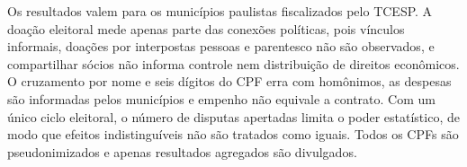 \documentclass[11pt,a4paper]{article}
\begin{document}
Os resultados valem para os municípios paulistas fiscalizados pelo TCESP. A doação eleitoral
mede apenas parte das conexões políticas, pois vínculos informais, doações por interpostas
pessoas e parentesco não são observados, e compartilhar sócios não informa controle nem
distribuição de direitos econômicos. O cruzamento por nome e seis dígitos do CPF erra com
homônimos, as despesas são informadas pelos municípios e empenho não equivale a contrato. Com um
único ciclo eleitoral, o número de disputas apertadas limita o poder estatístico, de modo que
efeitos indistinguíveis não são tratados como iguais. Todos os CPFs são pseudonimizados e
apenas resultados agregados são divulgados.

\newpage


\end{document}
